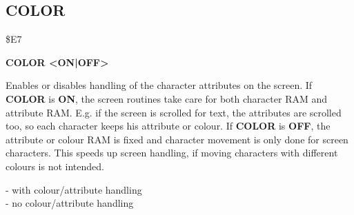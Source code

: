 
\newpage
\subsection{COLOR}
\begin{description}[leftmargin=3cm,style=nextline]
\item [Token:] \$E7
\item [Format:] {\bf COLOR <ON|OFF>}
\item [Usage:] Enables or disables
               handling of the character attributes on the screen.
               If {\bf COLOR} is {\bf ON}, the screen routines
               take care for both character RAM and attribute RAM.
               E.g. if the screen is scrolled for text, the attributes
               are scrolled too, so each character keeps his attribute
               or colour. If {\bf COLOR} is {\bf OFF}, the attribute
               or colour RAM is fixed and character movement is only
               done for screen characters. This speeds up screen
               handling, if moving characters with different colours is
               not intended.
\item [Example:]  - with colour/attribute handling \\
                  - no colour/attribute handling

\end{description}


\newpage
